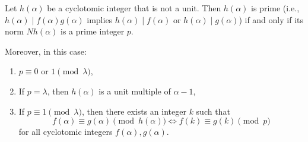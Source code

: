 Let $h(\alpha)$ be a cyclotomic integer that is not a unit. Then $h(\alpha)$ is prime (i.e., $h(\alpha) \mid f(\alpha)g(\alpha)$ implies $h(\alpha) \mid f(\alpha)$ or $h(\alpha) \mid g(\alpha)$) if and only if its norm $Nh(\alpha)$ is a prime integer $p$.

Moreover, in this case:
\begin{enumerate}
\item $p \equiv 0$ or $1 \pmod{\lambda}$,
\item If $p = \lambda$, then $h(\alpha)$ is a unit multiple of $\alpha - 1$,
\item If $p \equiv 1 \pmod{\lambda}$, then there exists an integer $k$ such that
$$f(\alpha) \equiv g(\alpha) \pmod{h(\alpha)} \iff f(k) \equiv g(k) \pmod{p}$$
for all cyclotomic integers $f(\alpha), g(\alpha)$.
\end{enumerate}
